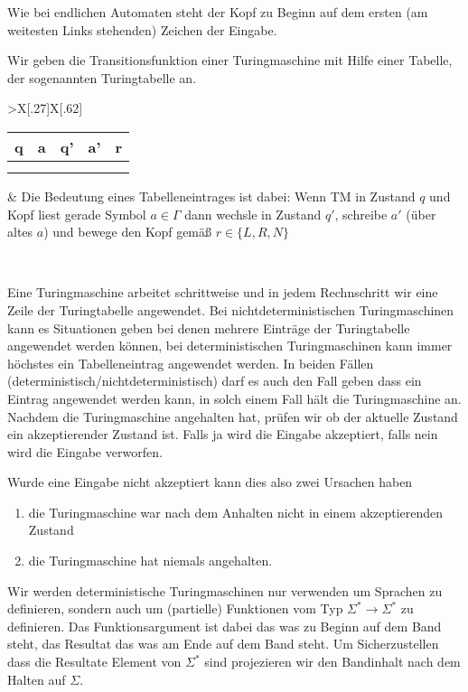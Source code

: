 Wie bei endlichen Automaten steht der Kopf zu Beginn auf dem ersten (am weitesten Links stehenden) Zeichen der Eingabe.
 
 \smallskip
 
 Wir geben die Transitionsfunktion einer Turingmaschine mit Hilfe einer Tabelle, der sogenannten Turingtabelle an.
 
 \begin{tabu}{>{\bfseries}X[.27]X[.62]}
	\begin{tabular}{|*5{c|}}
		q & a & q' & a' & r \\\hline
		&&&&\\
		&&&&
	\end{tabular}
	& 	Die Bedeutung eines Tabelleneintrages ist dabei: Wenn \ac{TM} in Zustand $q$ und Kopf liest
        gerade Symbol $a\in\Gamma$ dann wechsle in Zustand $q'$,
        schreibe $a'$ (über altes $a$) und bewege den Kopf gemäß
        $r\in\{L,R,N\}$ 
\end{tabu}\

Eine Turingmaschine arbeitet schrittweise und in jedem Rechnschritt wir eine Zeile der Turingtabelle angewendet.
Bei nichtdeterministischen Turingmaschinen kann es Situationen geben bei denen mehrere Einträge der Turingtabelle angewendet werden können,
bei deterministischen Turingmaschinen kann immer höchstes ein Tabelleneintrag angewendet werden.
In beiden Fällen (deterministisch/nichtdeterministisch) darf es auch den Fall geben dass ein Eintrag angewendet werden kann,
in solch einem Fall hält die Turingmaschine an.
Nachdem die Turingmaschine angehalten hat, prüfen wir ob der aktuelle Zustand ein akzeptierender Zustand ist. Falls ja wird die Eingabe akzeptiert, falls nein wird die Eingabe verworfen.

Wurde eine Eingabe nicht akzeptiert kann dies also zwei Ursachen haben
\begin{enumerate}
 \item die Turingmaschine war nach dem Anhalten nicht in einem akzeptierenden Zustand
 \item die Turingmaschine hat niemals angehalten.
\end{enumerate}

Wir werden deterministische Turingmaschinen nur verwenden um Sprachen zu definieren, sondern auch um (partielle) Funktionen vom Typ $\Sigma^*\rightarrow\Sigma^*$ zu definieren.
Das Funktionsargument ist dabei das was zu Beginn auf dem Band steht, das Resultat das was am Ende auf dem Band steht.
Um Sicherzustellen dass die Resultate Element von $\Sigma^*$ sind projezieren wir den Bandinhalt nach dem Halten auf $\Sigma$.

